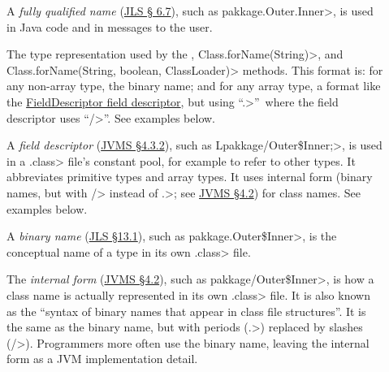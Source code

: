 \begin{description}

\item[]
  A \emph{fully qualified name} (\href{https://docs.oracle.com/javase/specs/jls/se11/html/jls-6.html#jls-6.7}{JLS \S
    6.7}), such as
  \<pakkage.Outer.Inner>, is used in Java code and in messages to
  the user.

\item[]
\begin{sloppypar}
  The type representation used by the
  , \<Class.forName(String)>,
  and \<Class.forName(String, boolean, ClassLoader)> methods.  This format
  is:  for any non-array type, the binary name; and for any array type, a
  format like the
  \href{https://docs.oracle.com/javase/specs/jvms/se11/html/jvms-4.html#jvms-4.3.2}{FieldDescriptor
    field descriptor}, but using
  ``\<.>''~where the field descriptor uses ``\</>''.  See examples below.
\end{sloppypar}

\item[]
  A \emph{field descriptor} (\href{https://docs.oracle.com/javase/specs/jvms/se11/html/jvms-4.html#jvms-4.3.2}{JVMS \S 4.3.2}), such as
  \<Lpakkage/Outer\$Inner;>, is used in a \<.class> file's constant pool,
  for example to refer to other types.  It abbreviates primitive types and
  array types.  It uses internal form (binary names, but with \</> instead of
  \<.>; see
  \href{https://docs.oracle.com/javase/specs/jvms/se11/html/jvms-4.html#jvms-4.2.1}{JVMS
    \S 4.2}) for class names.  See examples below.

\item[]
  A \emph{binary name} (\href{https://docs.oracle.com/javase/specs/jls/se11/html/jls-13.html#jls-13.1}{JLS \S 13.1}), such as
  \<pakkage.Outer\$Inner>, is
  the conceptual name of a type in its own \<.class> file.

\item[]
  The \emph{internal form}
  (\href{https://docs.oracle.com/javase/specs/jvms/se11/html/jvms-4.html#jvms-4.2}{JVMS
    \S 4.2}), such as \<pakkage/Outer\$Inner>, is how a class name is
  actually represented in its own \<.class> file.  It is also known as the
  ``syntax of binary names that appear in class file structures''.  It is
  the same as the binary name, but with periods (\<.>) replaced by slashes
  (\</>).  Programmers more often use the binary name, leaving the internal
  form as a JVM implementation detail.


\end{description}

